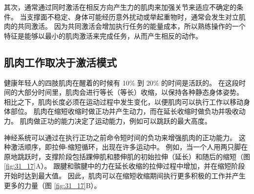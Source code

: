 其次，通常通过同时激活在相反方向产生力的肌肉来加强关节来适应不确定的条件。 当支撑面不稳定、身体可能经历意外扰动或举起重物时，通常会发生对立肌肉的共同激活。 因为共同激活会增加执行任务的能量成本，所以熟练操作的一个特征是能够以最小的肌肉激活来完成任务，从而产生相反的动作。

\subsection{肌肉工作取决于激活模式}

健康年轻人的四肢肌肉在醒着的时候有 10\% 到 20\% 的时间是活跃的。 在这段时间的大部分时间里，肌肉会进行等长（等长）收缩，以保持各种静态身体姿势。 相比之下，肌肉长度必须在运动过程中发生变化，以便肌肉可以执行工作以移动身体部位。 肌肉在缩短收缩时做正功并产生动力，而在延长收缩时做负功并吸收动力。 肌肉做正功的能力决定了运动能力，例如可以跳跃的最大高度。

神经系统可以通过在执行正功之前命令短时间的负功来增强肌肉的正功能力。 这种激活顺序，即拉伸-缩短循环，出现在许多运动中。 
例如，当一个人用两只脚在原地跳跃时，支撑阶段包括踝伸肌和膝伸肌的初始拉伸（延长）和随后的缩短（图 \ref{fig:31_17}A）。 
跟腱和髌腱中的力在延长收缩的拉伸过程中增加，并在缩短阶段开始时达到最大值。 因此，肌肉可以在缩短收缩期间执行更多积极的工作并产生更多的力量（图 \ref{fig:31_17}B）。

